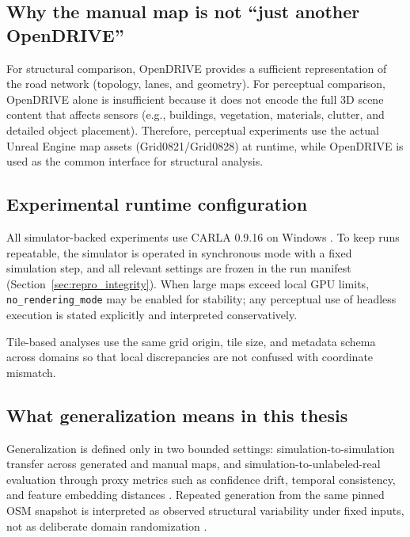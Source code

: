 \subsection{Why the manual map is not ``just another OpenDRIVE''}
\label{sec:manual_not_just_xodr}
For structural comparison, OpenDRIVE provides a sufficient representation of the road network (topology, lanes, and geometry).
For perceptual comparison, OpenDRIVE alone is insufficient because it does not encode the full 3D scene content that affects sensors (e.g., buildings, vegetation, materials, clutter, and detailed object placement).
Therefore, perceptual experiments use the actual Unreal Engine map assets (Grid0821/Grid0828) at runtime, while OpenDRIVE is used as the common interface for structural analysis.

\subsection{Experimental runtime configuration}
\label{sec:runtime_config}
All simulator-backed experiments use CARLA 0.9.16 on Windows \cite{dosovitskiy2017carla}. To keep runs repeatable, the simulator is operated in synchronous mode with a fixed simulation step, and all relevant settings are frozen in the run manifest (Section~\ref{sec:repro_integrity}). When large maps exceed local GPU limits, \texttt{no\_rendering\_mode} may be enabled for stability; any perceptual use of headless execution is stated explicitly and interpreted conservatively.

Tile-based analyses use the same grid origin, tile size, and metadata schema across domains so that local discrepancies are not confused with coordinate mismatch.

\subsection{What generalization means in this thesis}
\label{sec:generalization_definition}
Generalization is defined only in two bounded settings: simulation-to-simulation transfer across generated and manual maps, and simulation-to-unlabeled-real evaluation through proxy metrics such as confidence drift, temporal consistency, and feature embedding distances \cite{ben_david2010domain}. Repeated generation from the same pinned OSM snapshot is interpreted as observed structural variability under fixed inputs, not as deliberate domain randomization \cite{tobin2017domainrandomization}.

